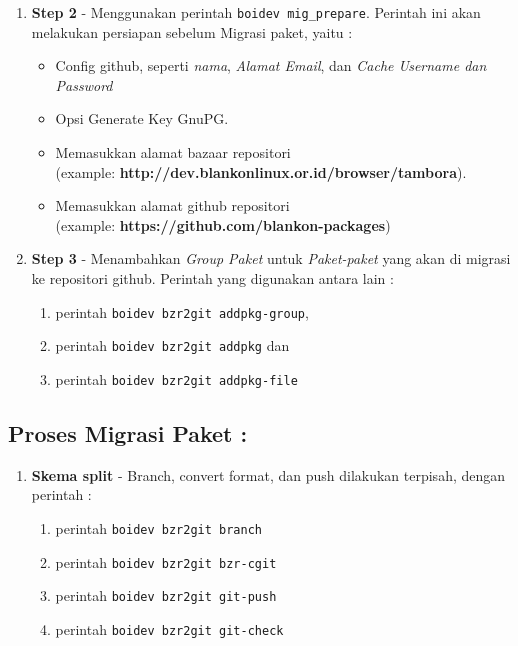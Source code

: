 {\begin{enumerate}
	\item \textbf{Step 2} - Menggunakan perintah \texttt{boidev mig\_prepare}. Perintah ini akan melakukan persiapan sebelum Migrasi paket, yaitu :
	\label{itm:pre_step2}
	\begin{itemize}
		\item Config github, seperti \textit{nama}, \textit{Alamat Email}, dan \textit{Cache Username dan Password}
		
		\item Opsi Generate Key GnuPG.
		
		\item Memasukkan alamat bazaar repositori\\ (example: \textbf{http://dev.blankonlinux.or.id/browser/tambora}).
		
		\item Memasukkan alamat github repositori\\ (example: \textbf{https://github.com/blankon-packages})	
	\end{itemize}
	
	\item \textbf{Step 3} -  Menambahkan \textit{Group Paket} untuk \textit{Paket-paket} yang akan di migrasi ke repositori github. Perintah yang digunakan antara lain :
	\label{itm:pre_step3}
	\begin{enumerate}
		\item perintah \texttt{boidev bzr2git addpkg-group},
		\item perintah \texttt{boidev bzr2git addpkg} dan
		\item perintah \texttt{boidev bzr2git addpkg-file}
	\end{enumerate}
\end{enumerate}

\subsection{Proses Migrasi Paket :}
\begin{enumerate}
	
	\item \textbf{Skema split} - Branch, convert format, dan push dilakukan terpisah, dengan perintah :
	\label{itm:metode_split}
	\begin{enumerate}
		\item perintah \texttt{boidev bzr2git branch}
		\item perintah \texttt{boidev bzr2git bzr-cgit}
		\item perintah \texttt{boidev bzr2git git-push}
		\item perintah \texttt{boidev bzr2git git-check}
	\end{enumerate}
	

\end{enumerate}}
